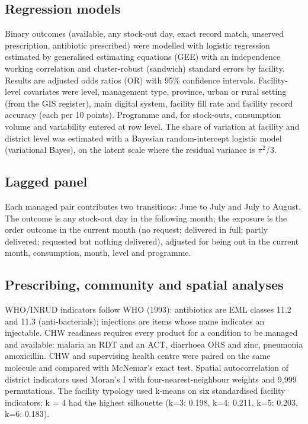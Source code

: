 \documentclass[10pt,a4paper]{article}
\begin{document}
\subsection{Regression models}
Binary outcomes (available, any stock-out day, exact record match, unserved prescription, antibiotic prescribed) were modelled with logistic regression estimated by generalised estimating equations (GEE) with an independence working correlation and cluster-robust (sandwich) standard errors by facility. Results are adjusted odds ratios (OR) with 95\% confidence intervals. Facility-level covariates were level, management type, province, urban or rural setting (from the GIS register), main digital system, facility fill rate and facility record accuracy (each per 10 points). Programme and, for stock-outs, consumption volume and variability entered at row level. The share of variation at facility and district level was estimated with a Bayesian random-intercept logistic model (variational Bayes), on the latent scale where the residual variance is $\pi^2$/3.

\subsection{Lagged panel}
Each managed pair contributes two transitions: June to July and July to August. The outcome is any stock-out day in the following month; the exposure is the order outcome in the current month (no request; delivered in full; partly delivered; requested but nothing delivered), adjusted for being out in the current month, consumption, month, level and programme.

\subsection{Prescribing, community and spatial analyses}
WHO/INRUD indicators follow WHO (1993): antibiotics are EML classes 11.2 and 11.3 (anti-bacterials); injections are items whose name indicates an injectable. CHW readiness requires every product for a condition to be managed and available: malaria an RDT and an ACT, diarrhoea ORS and zinc, pneumonia amoxicillin. CHW and supervising health centre were paired on the same molecule and compared with McNemar's exact test. Spatial autocorrelation of district indicators used Moran's I with four-nearest-neighbour weights and 9,999 permutations. The facility typology used k-means on six standardised facility indicators; k = 4 had the highest silhouette (k=3: 0.198, k=4: 0.211, k=5: 0.203, k=6: 0.183).
\end{document}
